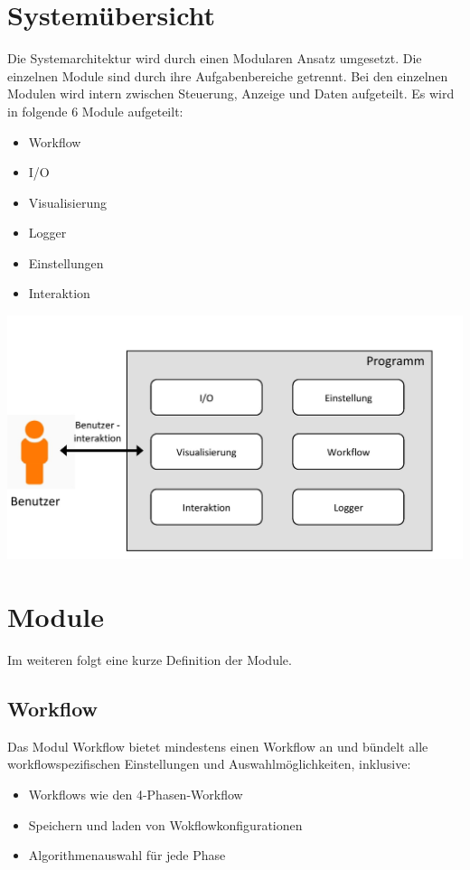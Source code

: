 \section{Systemübersicht}
Die Systemarchitektur wird durch einen Modularen Ansatz umgesetzt.
Die einzelnen Module sind durch ihre Aufgabenbereiche getrennt.
Bei den einzelnen Modulen wird intern zwischen Steuerung, Anzeige und Daten aufgeteilt.
Es wird in folgende 6 Module aufgeteilt:

\begin{itemize}
\item Workflow
\item I/O
\item Visualisierung
\item Logger
\item Einstellungen
\item Interaktion
\end{itemize}
\includegraphics[scale=0.35]{img/Uebersicht.jpg} 

\newpage 
\section{Module}
Im weiteren folgt eine kurze Definition der Module.

\subsection{Workflow}
Das Modul Workflow bietet mindestens einen Workflow an und bündelt alle workflowspezifischen
Einstellungen und Auswahlmöglichkeiten, inklusive:

\begin{itemize}
\item Workflows wie den 4-Phasen-Workflow
\item Speichern und laden von Wokflowkonfigurationen
\item Algorithmenauswahl für jede Phase 
\end{itemize}

